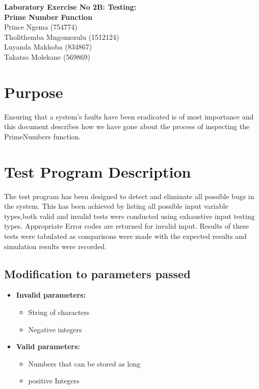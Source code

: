 \documentclass[11 pt]{article}
\begin{document}
  
  \begin{titlepage}
\begin{center}
\huge{\bfseries{Laboratory Exercise No 2B: Testing:}}\\
[2mm]
\huge{\bfseries{Prime Number Function}}\\

  \vskip 0.2in
 Prince Ngema (754774)\\
 Tholithemba Mngomezulu (1512124)\\
 Luyanda Makhoba (834867) \\
 Takatso Molekane (569869)\\
 
 

\end{center}
 \end{titlepage}
 \tableofcontents
 \newpage
 \section{Purpose}
Ensuring that a system's faults have been eradicated is of most importance and this document describes how we have gone about the process of inspecting the PrimeNumbers function.
\section{Test Program Description}
The test program has been designed to detect and eliminate all possible bugs in the system. This has been achieved by listing all possible input variable types,both valid and invalid tests were conducted using exhaustive input testing types. Appropriate Error codes are returned for invalid input. Results of these tests were tabulated as comparisons were made with the expected results and simulation results were recorded.\\



\subsection{Modification to parameters passed}
\begin{itemize}
\item
\textbf{Invalid parameters:}
\begin{itemize}
\item
String of characters
\item
Negative integers
\end{itemize}

\item
\textbf{Valid parameters:}
\begin{itemize}
\item
Numbers that can be stored as long
\item
 positive Integers
\end{itemize}
\end{itemize}
\end{document}

